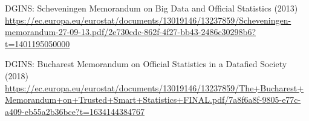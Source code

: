 %
%
% 
% 
%
\begin{thebibliography}{99.}

     DGINS: Scheveningen Memorandum on Big Data and Official Statistics (2013) \\
    \url{https://ec.europa.eu/eurostat/documents/13019146/13237859/Scheveningen-memorandum-27-09-13.pdf/2e730cdc-862f-4f27-bb43-2486c30298b6?t=1401195050000}

     DGINS: Bucharest Memorandum on Official Statistics in a Datafied Society (2018) \\
    \url{https://ec.europa.eu/eurostat/documents/13019146/13237859/The+Bucharest+Memorandum+on+Trusted+Smart+Statistics+FINAL.pdf/7a8f6a8f-9805-e77c-a409-eb55a2b36bce?t=1634144384767}

\end{thebibliography}
